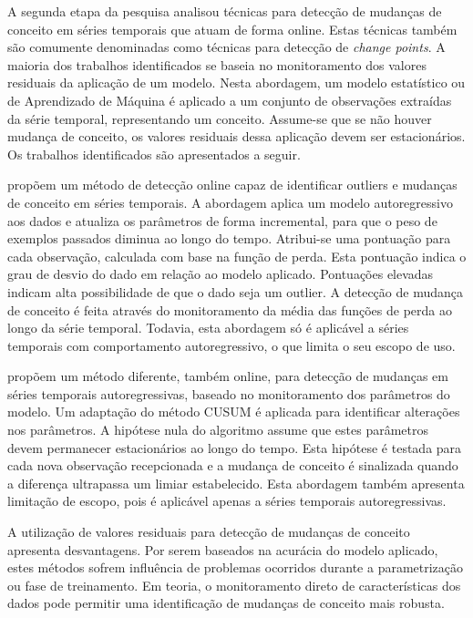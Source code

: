 \documentclass[msc, classic, a4paper]{ufbathesis}
\begin{document}
A segunda etapa da pesquisa analisou técnicas para detecção de mudanças de conceito em séries temporais que atuam de forma online. Estas técnicas também são comumente denominadas como técnicas para detecção de \textit{change points}. A maioria dos trabalhos identificados se baseia no monitoramento dos valores residuais da aplicação de um modelo. Nesta abordagem, um modelo estatístico ou de Aprendizado de Máquina é aplicado a um conjunto de observações extraídas da série temporal, representando um conceito.
Assume-se que se não houver mudança de conceito, os valores residuais dessa aplicação devem ser estacionários. Os trabalhos identificados são apresentados a seguir.

 propõem um método de detecção online capaz de identificar outliers e mudanças de conceito em séries temporais.
A abordagem aplica um modelo autoregressivo aos dados e atualiza os parâmetros de forma incremental, para que o peso de exemplos passados diminua ao longo do tempo. Atribui-se uma pontuação para cada observação, calculada com base na função de perda. Esta pontuação indica o grau de desvio do dado em relação ao modelo aplicado. Pontuações elevadas indicam alta possibilidade de que o dado seja um outlier. A detecção de mudança de conceito é feita através do monitoramento da média das funções de perda ao longo da série temporal. Todavia, esta abordagem só é aplicável a séries temporais com comportamento autoregressivo, o que limita o seu escopo de uso.

 propõem um método diferente, também online, para detecção de mudanças em séries temporais autoregressivas, baseado no monitoramento dos parâmetros do modelo. Um adaptação do método CUSUM \cite{Page:CUSUM:PageHinkley:1954} é aplicada para identificar alterações nos parâmetros. A hipótese nula do algoritmo assume que estes parâmetros devem permanecer estacionários ao longo do tempo. Esta hipótese é testada para cada nova observação recepcionada e a mudança de conceito é sinalizada quando a diferença ultrapassa um limiar estabelecido. Esta abordagem também apresenta limitação de escopo, pois é aplicável apenas a séries temporais autoregressivas.

A utilização de valores residuais para detecção de mudanças de conceito  apresenta desvantagens. Por serem baseados na acurácia do modelo aplicado, estes métodos sofrem influência de problemas ocorridos durante a parametrização ou fase de treinamento. Em teoria, o monitoramento direto de características dos dados pode permitir uma identificação de mudanças de conceito mais robusta.
\end{document}
